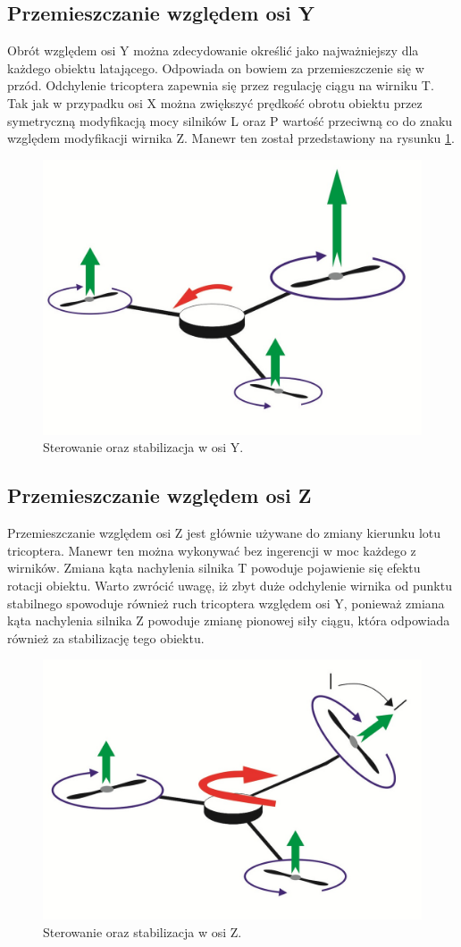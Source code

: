 \subsection{Przemieszczanie względem osi Y}
Obrót względem osi Y można zdecydowanie określić jako najważniejszy dla każdego obiektu latającego. Odpowiada on bowiem za przemieszczenie się w przód. Odchylenie tricoptera zapewnia się przez regulację ciągu na wirniku T. Tak jak w przypadku osi X można zwiększyć prędkość obrotu obiektu przez symetryczną modyfikacją mocy silników L oraz P wartość przeciwną co do znaku względem modyfikacji wirnika Z. Manewr ten został przedstawiony na rysunku \ref{fig:axis_y}.
\begin{figure}[!htbp]
\centering
\includegraphics[width=0.7\linewidth]{./include/axis_y}
\caption{Sterowanie oraz stabilizacja w osi Y.}
\label{fig:axis_y}
\end{figure}


\subsection{Przemieszczanie względem osi Z}
Przemieszczanie względem osi Z jest głównie używane do zmiany kierunku lotu tricoptera. Manewr ten można wykonywać bez ingerencji w moc każdego z wirników. Zmiana kąta nachylenia silnika T powoduje pojawienie się efektu rotacji obiektu. Warto zwrócić uwagę, iż zbyt duże odchylenie wirnika od punktu stabilnego spowoduje również ruch tricoptera względem osi Y, ponieważ zmiana kąta nachylenia silnika Z powoduje zmianę pionowej siły ciągu, która odpowiada również za stabilizację tego obiektu. 

\begin{figure}[!htbp]
\centering
\includegraphics[width=0.7\linewidth]{./include/axis_z}
\caption{Sterowanie oraz stabilizacja w osi Z.}
\label{fig:axis_z}
\end{figure}


